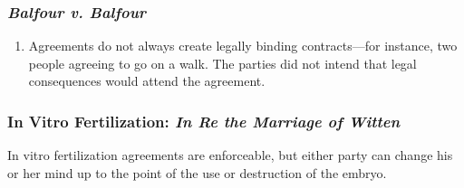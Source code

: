 \subsubsection{\emph{Balfour v. Balfour}}

\begin{enumerate}
    \item Agreements do not always create legally binding contracts---for 
    instance, two people agreeing to go on a walk. The parties did not intend 
    that legal consequences would attend the agreement.
\end{enumerate}

\subsubsection{In Vitro Fertilization: \emph{In Re the Marriage of Witten}}

In vitro fertilization agreements are enforceable, but either party can change 
his or her mind up to the point of the use or destruction of the embryo.

